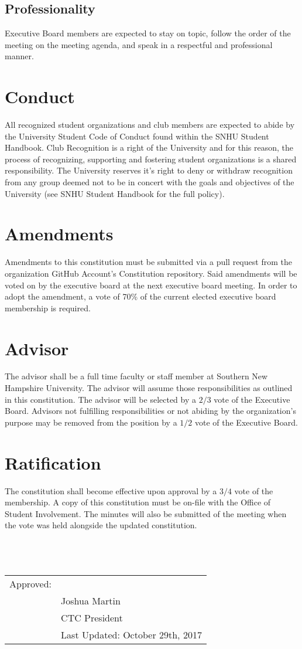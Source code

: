 \documentclass{article}
\newcommand{\datechanged}{Last Updated: October 29th, 2017}
\newcommand{\article}[1]{\section{#1} \label{#1}}
\newcommand{\asection}[1]{\subsection{#1} \label{#1}}
\begin{document}
\asection{Professionality}
Executive Board members are expected to stay on topic, follow the order of the meeting on the meeting agenda, and speak in a respectful and professional manner. 
 
\article{Conduct}
All recognized student organizations and club members are expected to abide by the University Student Code of Conduct found within the SNHU Student Handbook. 
Club Recognition is a right of the University and for this reason, the process of recognizing, supporting and fostering student organizations is a shared responsibility. 
The University reserves it's right to deny or withdraw recognition from any group deemed not to be in concert with the goals and objectives of the University (see SNHU Student Handbook for the full policy).

\article{Amendments}
Amendments to this constitution must be submitted via a pull request from the organization GitHub Account's Constitution repository. 
Said amendments will be voted on by the executive board at the next executive board meeting. 
In order to adopt the amendment, a vote of 70\% of the current elected executive board membership is required.

\article{Advisor}
The advisor shall be a full time faculty or staff member at Southern New Hampshire University. 
The advisor will assume those responsibilities as outlined in this constitution. 
The advisor will be selected by a $2/3$ vote of the Executive Board. 
Advisors not fulfilling responsibilities or not abiding by the organization's purpose may be removed from the position by a $1/2$ vote of the Executive Board.

\article{Ratification}
The constitution shall become effective upon approval by a $3/4$ vote of the membership. 
A copy of this constitution must be on-file with the Office of Student Involvement. 
The minutes will also be submitted of the meeting when the vote was held alongside the updated constitution.\\ \\ \\ \\

\begin{tabular}{@{}p{.5in}p{4in}@{}}
Approved: & \hrulefill \\
& Joshua Martin \\
& CTC President\\
& \datechanged
\end{tabular}
\end{document}
